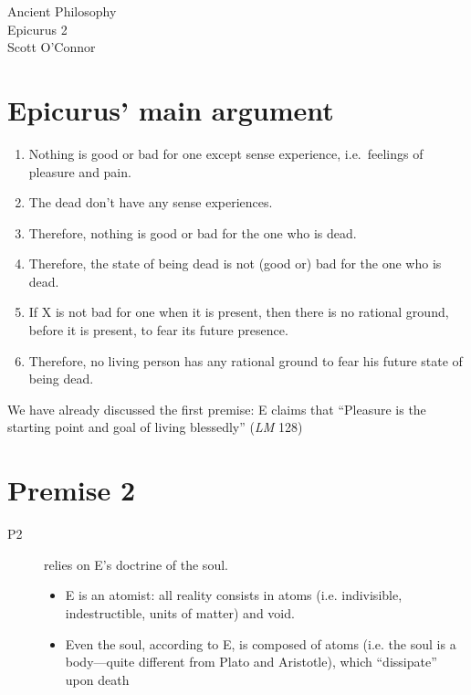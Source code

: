 \documentclass[11pt]{article}
\begin{document}
\thispagestyle{empty}
\begin{center} \LARGE{Ancient Philosophy\\ Epicurus 2}\\ \vspace*{2mm}
\large{Scott O'Connor}\end{center}
\thispagestyle{empty}\vspace*{3mm}

\section*{Epicurus' main argument}

\begin{enumerate}
\item Nothing is good or bad for one except sense experience, i.e.~feelings of pleasure and pain. 
\item The dead don't have any sense experiences. 
\item Therefore, nothing is good or bad for the one who is dead. 
\item Therefore, the state of being dead is not (good or) bad for the one who is dead. 
\item If X is not bad for one when it is present, then there is no rational
ground, before it is present, to fear its future presence. 
\item Therefore, no living person has any rational ground to fear his future state of being dead.
\end{enumerate}

We have already discussed the first premise:  E claims that ``Pleasure is the starting point and goal of living blessedly'' (\emph{LM} 128)

\section*{Premise 2}
\begin{description}
\item[P2] relies on E's doctrine of the soul. 
\begin{itemize}
\item E is an atomist: all reality consists in atoms (i.e. indivisible, indestructible, units of matter) and void.
\item Even the soul, according to E, is composed of atoms (i.e. the soul is a body---quite different from Plato and Aristotle), which ``dissipate'' upon death
\end{itemize}
\end{description}
\end{document}
